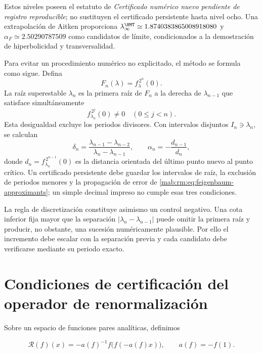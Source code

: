 Estos niveles poseen el estatuto de \emph{Certificado num\'erico nuevo
pendiente de registro reproducible}; no sustituyen el certificado persistente
hasta nivel ocho. Una extrapolaci\'on de Aitken proporciona
\(\lambda_\infty^{\HMT}\simeq1.8740383865008918080\) y
\(\alpha_F\simeq2.50290787509\) como candidatos de l\'imite, condicionados a
la demostraci\'on de hiperbolicidad y transversalidad.

Para evitar un procedimiento num\'erico no explicitado, el m\'etodo se formula como
sigue. Defina
\begin{equation}
F_n(\lambda)=f_\lambda^{\,2^n}(0).
\label{mab:rm:eq:superstable-equation}
\end{equation}
La ra\'iz superestable \(\lambda_n\) es la primera ra\'iz de \(F_n\) a la
derecha de \(\lambda_{n-1}\) que satisface simult\'aneamente
\[
f_{\lambda_n}^{\,2^j}(0)\ne0
\quad(0\le j<n).
\]
Esta desigualdad excluye los periodos divisores. Con intervalos disjuntos
\(I_n\ni\lambda_n\), se calculan
\begin{equation}
\delta_n=
\frac{\lambda_{n-1}-\lambda_{n-2}}
     {\lambda_n-\lambda_{n-1}},
\qquad
\alpha_n=-\frac{d_{n-1}}{d_n},
\label{mab:rm:eq:feigenbaum-approximants}
\end{equation}
donde \(d_n=f_{\lambda_n}^{\,2^{n-1}}(0)\) es la distancia orientada del
\'ultimo punto nuevo al punto cr\'itico. Un certificado persistente debe guardar
los intervalos de ra\'iz, la exclusi\'on de periodos menores y la propagaci\'on
de error de \cref{mab:rm:eq:feigenbaum-approximants}; un simple decimal impreso no
cumple esas tres condiciones.

La regla de discretizaci\'on constituye asimismo un control negativo. Una
cota inferior fija mayor que la separaci\'on
\(|\lambda_n-\lambda_{n-1}|\) puede omitir la primera ra\'iz y producir, no
obstante, una sucesi\'on num\'ericamente plausible. Por ello el incremento
debe escalar con la separaci\'on previa y cada candidato debe verificarse
mediante su periodo exacto.

\section{Condiciones de certificaci\'on del operador de renormalizaci\'on}

Sobre un espacio de funciones pares anal\'iticas, definimos

\begin{equation}
\mathcal R(f)(x)=-a(f)^{-1}f\bigl(f(-a(f)x)\bigr),
\qquad a(f)=-f(1).
\label{mab:rm:eq:renormalization}
\end{equation}

